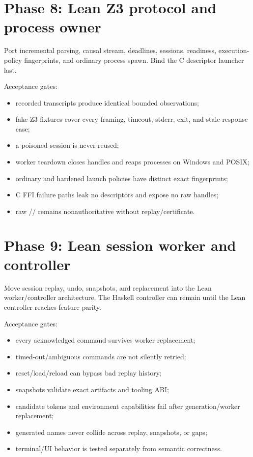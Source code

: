 \documentclass[10pt,letterpaper,oneside]{report}
\newcommand{\code}[1]{\texttt{\detokenize{#1}}}
\begin{document}
\section{Phase 8: Lean Z3 protocol and process owner}

Port incremental parsing, causal stream, deadlines, sessions, readiness, execution-policy fingerprints, and ordinary process spawn. Bind the C descriptor launcher last.

Acceptance gates:

\begin{itemize}
  \item recorded transcripts produce identical bounded observations;
  \item fake-Z3 fixtures cover every framing, timeout, stderr, exit, and stale-response case;
  \item a poisoned session is never reused;
  \item worker teardown closes handles and reaps processes on Windows and POSIX;
  \item ordinary and hardened launch policies have distinct exact fingerprints;
  \item C FFI failure paths leak no descriptors and expose no raw handles;
  \item raw \code{sat}/\code{unsat}/\code{unknown} remains nonauthoritative without replay/certificate.
\end{itemize}

\section{Phase 9: Lean session worker and controller}

Move session replay, undo, snapshots, and replacement into the Lean worker/controller architecture. The Haskell controller can remain until the Lean controller reaches feature parity.

Acceptance gates:

\begin{itemize}
  \item every acknowledged command survives worker replacement;
  \item timed-out/ambiguous commands are not silently retried;
  \item reset/load/reload can bypass bad replay history;
  \item snapshots validate exact artifacts and tooling ABI;
  \item candidate tokens and environment capabilities fail after generation/worker replacement;
  \item generated \code{itN} names never collide across replay, snapshots, or gaps;
  \item terminal/UI behavior is tested separately from semantic correctness.
\end{itemize}
\end{document}
